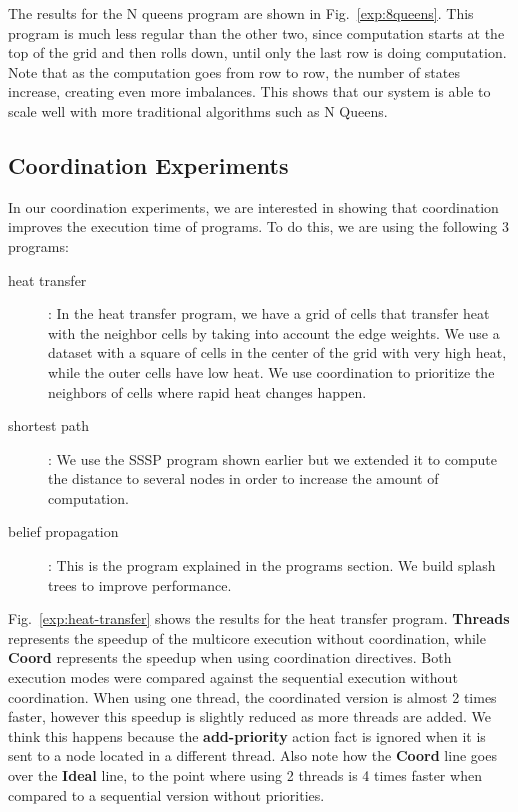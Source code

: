 The results for the N queens program are shown in Fig.~\ref{exp:8queens}. This program is much less regular than the other two, since computation starts at the top of the grid and then rolls down, until only the last row is doing computation. Note that as the computation goes from row to row, the number of states increase, creating even more imbalances. This shows that our system is able to scale well with more traditional algorithms such as N Queens.

\subsection{Coordination Experiments}

In our coordination experiments, we are interested in showing that coordination improves the execution time of programs.
To do this, we are using the following 3 programs:

\begin{description}
   \item[heat transfer]: In the heat transfer program, we have a grid of cells that transfer heat with the neighbor cells by taking into account the edge weights. We use a dataset with a square of cells in the center of the grid with very high heat, while the outer cells have low heat. We use coordination to prioritize the neighbors of cells where rapid heat changes happen.
   \item[shortest path]: We use the SSSP program shown earlier but we extended it to compute the distance to several nodes in order to increase the amount of computation.
   \item[belief propagation]: This is the program explained in the programs section. We build splash trees to improve performance.
\end{description}

Fig.~\ref{exp:heat-transfer} shows the results for the heat transfer program. \textbf{Threads} represents the speedup of the multicore execution
without coordination, while \textbf{Coord} represents the speedup when using coordination directives.
Both execution modes were compared against the sequential execution without coordination.
When using one thread, the coordinated version is almost 2 times
faster, however this speedup is slightly reduced as more threads are added. We think this happens because the \textbf{add-priority} action fact is ignored
when it is sent to a node located in a different thread.
Also note how the \textbf{Coord} line goes over the \textbf{Ideal} line, to the point where using 2 threads is 4 times faster when compared to a sequential
version without priorities.

